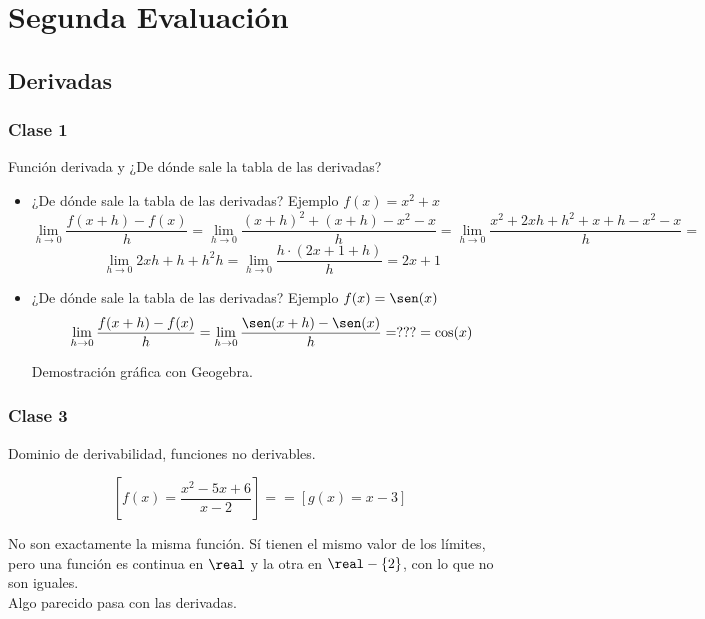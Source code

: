 

\chapter{Segunda Evaluación}
\section{Derivadas}
\subsection*{Clase 1} Función derivada y ¿De dónde sale la tabla de las derivadas?

\begin{itemize}
\item  ¿De dónde sale la tabla de las derivadas? Ejemplo $f(x) = x^2+x$
\[
\lim_{h\to 0} \frac{f(x+h)-f(x)}{h} = \lim_{h\to 0} \frac{(x+h)^2+(x+h) - x^2-x}{h} = \lim_{h\to 0}\frac{x^2+2xh+h^2+x+h-x^2-x}{h} =\]
\[ \lim_{h\to 0}{2xh+h+h^2}{h} = \lim_{h\to 0}\frac{h·(2x+1+h)}{h} = 2x+1
\]

\item  ¿De dónde sale la tabla de las derivadas? Ejemplo $f(x) = \sen(x)$
\[
\lim_{h\to 0} \frac{f(x+h)-f(x)}{h} = \lim_{h\to 0} \frac{\sen(x+h) - \sen(x)}{h} = ??? = \cos(x)
\]

Demostración gráfica con Geogebra.

\end{itemize}

\subsection*{Clase 3} Dominio de derivabilidad, funciones no derivables.

\[
\left[f(x) = \frac{x^2-5x+6}{x-2}\right] == \left[g(x) = x-3\right]
\]

No son exactamente la misma función. Sí tienen el mismo valor de los límites, pero una función es continua en $\real$ y la otra en $\real-\{2\}$, con lo que no son iguales.
\\
Algo parecido pasa con las derivadas.

